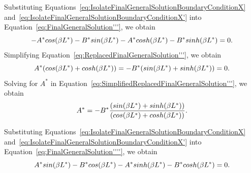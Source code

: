 \documentclass[12pt]{article}
\begin{document}
Substituting Equations~\eqref{eq:IsolateFinalGeneralSolutionBoundaryConditionX} and~\eqref{eq:IsolateFinalGeneralSolutionBoundaryConditionX'} into Equation~\eqref{eq:FinalGeneralSolution'''}, we obtain
\begin{equation}\label{eq:ReplacedFinalGeneralSolution'''}
    \centering
    -A^*cos(\beta L^*)-B^*sin(\beta L^*)-A^*cosh(\beta L^*)-B^*sinh(\beta L^*)=0.
\end{equation}
Simplifying Equation~\eqref{eq:ReplacedFinalGeneralSolution'''}, we obtain
\begin{equation}\label{eq:SimplifiedReplacedFinalGeneralSolution'''}
    \centering
    A^*(cos(\beta L^*)+cosh(\beta L^*))=-B^*(sin(\beta L^*)+sinh(\beta L^*))=0.
\end{equation}
Solving for $A^*$ in Equation~\eqref{eq:SimplifiedReplacedFinalGeneralSolution'''}, we obtain
\begin{equation}\label{eq:SolveASimplifiedReplacedFinalGeneralSolution'''}
    \centering
    A^*=-B^*\frac{(sin(\beta L^*)+sinh(\beta L^*))}{(cos(\beta L^*)+cosh(\beta L^*))}.
\end{equation}

Substituting Equations~\eqref{eq:IsolateFinalGeneralSolutionBoundaryConditionX} and~\eqref{eq:IsolateFinalGeneralSolutionBoundaryConditionX'} into Equation~\eqref{eq:FinalGeneralSolution''''}, we obtain
\begin{equation}\label{eq:ReplacedFinalGeneralSolution''''}
    \centering
    A^*sin(\beta L^*)-B^*cos(\beta L^*)-A^*sinh(\beta L^*)-B^*cosh(\beta L^*)=0.
\end{equation}
\end{document}
